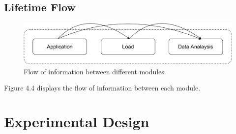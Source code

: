 \subsection{Lifetime Flow}
\begin{figure}[H]
    \centering
    \includegraphics[width=0.5\linewidth]{images/Flow-Information.pdf}
    \caption{Flow of information between different modules.}
\end{figure} 
Figure 4.4 displays the flow of information between each module. 

\section{Experimental Design}





